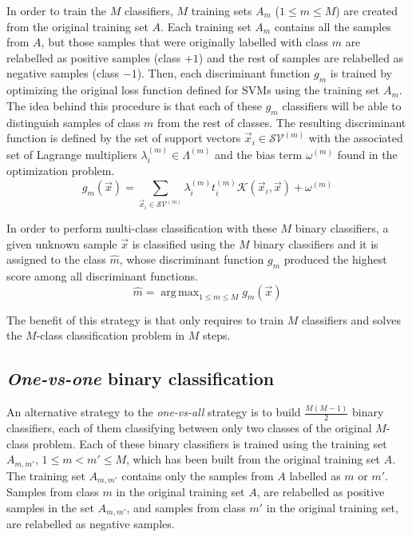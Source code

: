 \documentclass[10pt,a4paper]{article}
\DeclareMathOperator*{\argmax}{arg\,max}
\begin{document}
In order to train the $M$ classifiers, $M$ training sets $A_m$ ($1 \leq m \leq M$) are created from the original training set $A$. Each training set $A_m$ contains all the samples from $A$, but those samples that were originally labelled with class $m$ are relabelled as positive samples (class $+1$) and the rest of samples are relabelled as negative samples (class $-1$). Then, each discriminant function $g_m$ is trained by optimizing the original loss function defined for SVMs using the training set $A_m$. The idea behind this procedure is that each of these $g_m$ classifiers will be able to distinguish samples of class $m$ from the rest of classes. The resulting discriminant function is defined by the set of support vectors $\vec{x}_i \in \mathcal{SV}^{(m)}$ with the associated set of Lagrange multipliers $\lambda_i^{(m)} \in \Lambda^{(m)}$ and the bias term $\omega^{(m)}$ found in the optimization problem.
\begin{equation}
g_m(\vec{x}) = \sum_{\vec{x}_i \in \mathcal{SV}^{(m)}} \lambda_i^{(m)} t_i^{(m)} \mathcal{K}(\vec{x}_i, \vec{x}) + \omega^{(m)}
\end{equation}

In order to perform multi-class classification with these $M$ binary classifiers, a given unknown sample $\vec{x}$ is classified using the $M$ binary classifiers and it is assigned to the class $\hat{m}$, whose discriminant function $g_{\hat{m}}$ produced the highest score among all discriminant functions.\\

\begin{equation}
\hat{m} = \argmax_{1\leq m \leq M} g_m(\vec{x})
\end{equation}

The benefit of this strategy is that only requires to train $M$ classifiers and solves the $M$-class classification problem in $M$ steps.

\subsection{\emph{One-vs-one} binary classification}
An alternative strategy to the \emph{one-vs-all} strategy is to build $\frac{M (M-1)}{2}$ binary classifiers, each of them classifying between only two classes of the original $M$-class problem.
Each of these binary classifiers is trained using the training set $A_{m,m'}$, $1 \leq m < m' \leq M$, which has been built from the original training set $A$. The training set $A_{m,m'}$ contains only the samples from $A$ labelled as $m$ or $m'$. Samples from class $m$ in the original training set $A$, are relabelled as positive samples in the set $A_{m,m'}$, and samples from class $m'$ in the original training set, are relabelled as negative samples.\\
\end{document}
